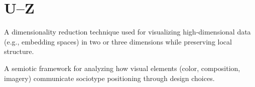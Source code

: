 \documentclass[../main.tex]{subfiles}
\begin{document}
\section*{U--Z}

\begin{description}[leftmargin=0.5cm, style=nextline]

\item[UMAP (Uniform Manifold Approximation and Projection)] A dimensionality reduction technique used for visualizing high-dimensional data (e.g., embedding spaces) in two or three dimensions while preserving local structure.

\item[Visual Register] A semiotic framework for analyzing how visual elements (color, composition, imagery) communicate sociotype positioning through design choices.

\end{description}

\end{document}
